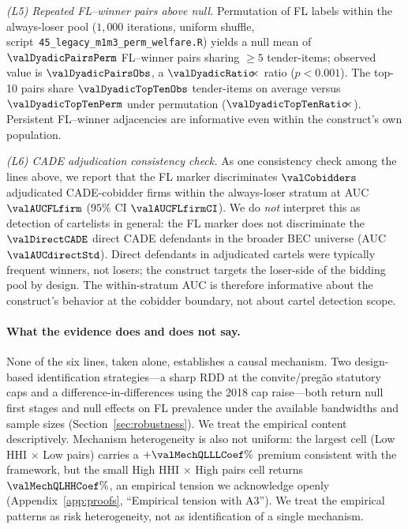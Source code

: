 \emph{(L5) Repeated FL--winner pairs above null.} Permutation
of FL labels within the always-loser pool ($1{,}000$ iterations,
uniform shuffle, script~\texttt{45\_legacy\_m1m3\_perm\_welfare.R}) yields a null
mean of $\valDyadicPairsPerm$ FL--winner pairs sharing $\geq 5$
tender-items; observed value is $\valDyadicPairsObs$, a $\valDyadicRatio\!\!\times$
ratio ($p < 0.001$). The top-10 pairs share $\valDyadicTopTenObs$
tender-items on average versus $\valDyadicTopTenPerm$ under permutation
($\valDyadicTopTenRatio\!\!\times$). Persistent FL--winner adjacencies are
informative even within the construct's own population.

\emph{(L6) CADE adjudication consistency check.} As one consistency
check among the lines above, we report that the FL marker
discriminates $\valCobidders$ adjudicated CADE-cobidder firms within
the always-loser stratum at AUC $\valAUCFLfirm$ ($95\%$ CI $\valAUCFLfirmCI$).
We do \emph{not} interpret this as
detection of cartelists in general: the FL marker does not
discriminate the $\valDirectCADE$ direct CADE defendants in the
broader BEC universe (AUC $\valAUCdirectStd$). Direct defendants in
adjudicated cartels were typically frequent winners, not losers; the
construct targets the loser-side of the bidding pool by design. The
within-stratum AUC is therefore informative about the construct's
behavior at the cobidder boundary, not about cartel detection scope.

\paragraph{What the evidence does and does not say.}
None of the six lines, taken alone, establishes a causal mechanism.
Two design-based identification strategies---a sharp RDD at the
convite/pregão statutory caps and a difference-in-differences using
the 2018 cap raise---both return null first stages and null effects
on FL prevalence under the available bandwidths and sample sizes
(Section~\ref{sec:robustness}). We treat the empirical content
descriptively. Mechanism heterogeneity is also not uniform: the
largest cell (Low HHI $\times$ Low pairs) carries a $+\valMechQLLLCoef\%$
premium consistent with the framework, but the small High HHI $\times$
High pairs cell returns $\valMechQLHHCoef\%$, an empirical tension we
acknowledge openly (Appendix~\ref{app:proofs}, ``Empirical tension
with A3''). We treat the empirical patterns as risk heterogeneity, not
as identification of a single mechanism.

